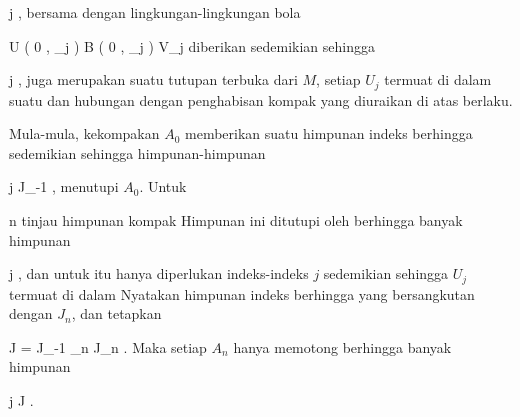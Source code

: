 {{ {}
 {j \in \N} {}
 {} {} {} {,}
bersama dengan lingkungan-lingkungan bola

\mavergleichskettedisp
{\vergleichskette
{ U \left(   0 , \delta_j   \right)
}
{ \subset} { B  \left(  0 , \epsilon_j  \right)
}
{ \subset} { V_j
}
{ } {
}
{ } {
}
}
{}{}{}
diberikan sedemikian sehingga

 {}
 {j \in \N} {}
 {} {} {} {,}
juga merupakan suatu tutupan terbuka dari $M$, setiap $U_j$ termuat di dalam suatu
 dan hubungan dengan penghabisan kompak yang diuraikan di atas berlaku.}
{}
{Mula-mula, kekompakan $A_0$ memberikan suatu himpunan indeks berhingga
 sedemikian sehingga himpunan-himpunan

 {}
 {j \in J_{-1}} {}
 {} {} {} {,}
menutupi $A_0$. Untuk

\mavergleichskette
{\vergleichskette
{ n
}
{ \in }{ \N
}
{  }{
}
{    }{
}
{   }{
}
}
{}{}{}
tinjau himpunan kompak
 Himpunan ini ditutupi oleh berhingga banyak himpunan

 {}
 {j \in \N} {}
 {} {} {} {,}
dan untuk itu hanya diperlukan indeks-indeks $j$ sedemikian sehingga $U_j$ termuat di dalam
 Nyatakan himpunan indeks berhingga yang bersangkutan dengan $J_n$, dan tetapkan

\mavergleichskette
{\vergleichskette
{ J
}
{ = }{ J_{-1} \cup \bigcup_{n \in \N} J_n
}
{  }{
}
{    }{
}
{   }{
}
}
{}{}{.}
Maka setiap $A_n$ hanya memotong berhingga banyak himpunan

 {}
 {j \in J} {}
 {} {} {} {.}}
{}

}




